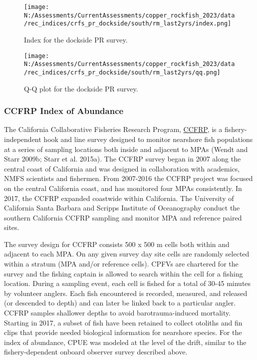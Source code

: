 \documentclass[11pt,
  english,
  letterpaper,
]{article}
\begin{document}
\newpage

\begin{figure}
\centering
\texttt{[image: N:/Assessments/CurrentAssessments/copper\_rockfish\_2023/data/rec\_indices/crfs\_pr\_dockside/south/rm\_last2yrs/index.png]}
\caption{Index for the dockside PR survey.\label{fig:pr-index}}
\end{figure}

\newpage

\begin{figure}
\centering
\texttt{[image: N:/Assessments/CurrentAssessments/copper\_rockfish\_2023/data/rec\_indices/crfs\_pr\_dockside/south/rm\_last2yrs/qq.png]}
\caption{Q-Q plot for the dockside PR survey.\label{fig:pr-qq}}
\end{figure}

\newpage

\hypertarget{ccfrp-index}{%
\subsubsection{CCFRP Index of Abundance}\label{ccfrp-index}}

The California Collaborative Fisheries Research Program, \href{https://www.mlml.calstate.edu/ccfrp/}{CCFRP}, is a fishery-independent hook and line survey designed to monitor nearshore fish populations at a series of sampling locations both inside and adjacent to MPAs (Wendt and Starr 2009b; Starr et al. 2015a). The CCFRP survey began in 2007 along the central coast of California and was designed in collaboration with academics, NMFS scientists and fishermen. From 2007-2016 the CCFRP project was focused on the central California coast, and has monitored four MPAs consistently. In 2017, the CCFRP expanded coastwide within California. The University of California Santa Barbara and Scripps Institute of Oceanography conduct the southern California CCFRP sampling and monitor MPA and reference paired sites.

The survey design for CCFRP consists 500 x 500 m cells both within and adjacent to each MPA. On any given survey day site cells are randomly selected within a stratum (MPA and/or reference cells). CPFVs are chartered for the survey and the fishing captain is allowed to search within the cell for a fishing location. During a sampling event, each cell is fished for a total of 30-45 minutes by volunteer anglers. Each fish encountered is recorded, measured, and released (or descended to depth) and can later be linked back to a particular angler. CCFRP samples shallower depths to avoid barotrauma-induced mortality. Starting in 2017, a subset of fish have been retained to collect otoliths and fin clips that provide needed biological information for nearshore species. For the index of abundance, CPUE was modeled at the level of the drift, similar to the fishery-dependent onboard observer survey described above.
\end{document}
